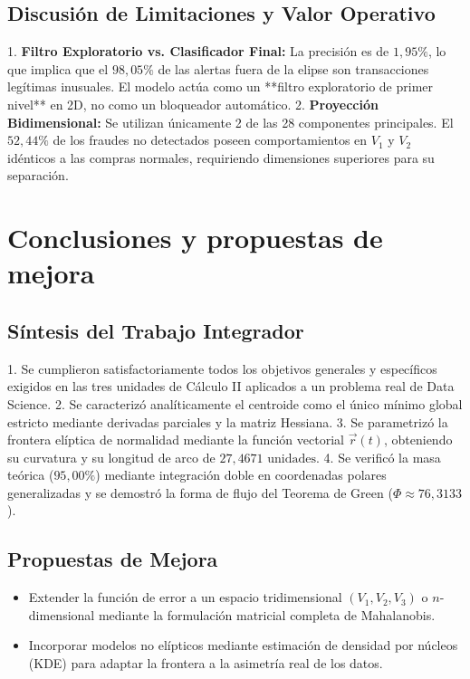 \documentclass[12pt,a4paper]{article}
\begin{document}
\subsection{Discusión de Limitaciones y Valor Operativo}
1. \textbf{Filtro Exploratorio vs. Clasificador Final:} La precisión es de $1{,}95\%$, lo que implica que el $98{,}05\%$ de las alertas fuera de la elipse son transacciones legítimas inusuales. El modelo actúa como un **filtro exploratorio de primer nivel** en 2D, no como un bloqueador automático.
2. \textbf{Proyección Bidimensional:} Se utilizan únicamente 2 de las 28 componentes principales. El $52{,}44\%$ de los fraudes no detectados poseen comportamientos en $V_1$ y $V_2$ idénticos a las compras normales, requiriendo dimensiones superiores para su separación.

\newpage

\section{Conclusiones y propuestas de mejora}

\subsection{Síntesis del Trabajo Integrador}
1. Se cumplieron satisfactoriamente todos los objetivos generales y específicos exigidos en las tres unidades de Cálculo II aplicados a un problema real de Data Science.
2. Se caracterizó analíticamente el centroide como el único mínimo global estricto mediante derivadas parciales y la matriz Hessiana.
3. Se parametrizó la frontera elíptica de normalidad mediante la función vectorial $\vec{r}(t)$, obteniendo su curvatura y su longitud de arco de $27{,}4671 \text{ unidades}$.
4. Se verificó la masa teórica ($95{,}00\%$) mediante integración doble en coordenadas polares generalizadas y se demostró la forma de flujo del Teorema de Green ($\Phi \approx 76{,}3133$).

\subsection{Propuestas de Mejora}
\begin{itemize}
    \item Extender la función de error a un espacio tridimensional $(V_1, V_2, V_3)$ o $n$-dimensional mediante la formulación matricial completa de Mahalanobis.
    \item Incorporar modelos no elípticos mediante estimación de densidad por núcleos (KDE) para adaptar la frontera a la asimetría real de los datos.
\end{itemize}
\end{document}
